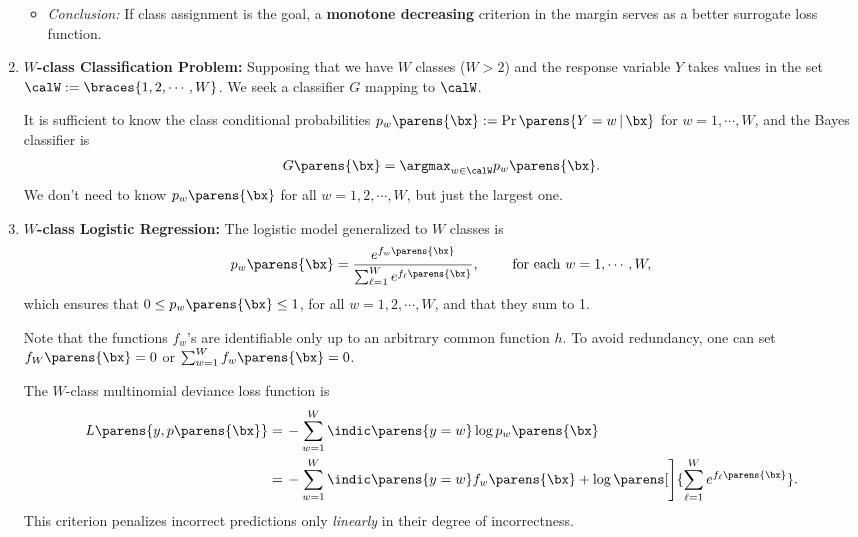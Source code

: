 \documentclass[12pt]{article}
\begin{document}
\begin{enumerate}[label=\textbf{\arabic*.}]
\begin{itemize}
		\item \textit{Conclusion:} If class assignment is the goal, a \textbf{monotone decreasing} criterion in the margin serves as a better surrogate loss function. 
		
	\end{itemize}
	
	\item \textbf{$W$-class Classification Problem:} Supposing that we have $W$ classes ($W > 2$) and the response variable $Y$ takes values in the set $\calW := \braces{1, 2, \cdots, W}$. We seek a classifier $G$ mapping to $\calW$. 
	
	It is sufficient to know the class conditional probabilities $p_w \parens{\bx} := \Pr \parens{Y = w \,\vert\, \bx}$ for $w = 1, \cdots, W$, and the Bayes classifier is 
	\begin{align*}
		G \parens{\bx} = \argmax_{w \in \calW} p_{w} \parens{\bx}. 
	\end{align*}
	We don't need to know $p_w \parens{\bx}$ for all $w = 1, 2, \cdots, W$, but just the largest one. 
	
	\item \textbf{$W$-class Logistic Regression:} The logistic model generalized to $W$ classes is 
	\begin{align*}
		p_w \parens{\bx} = \frac{e^{f_w \parens{\bx}}}{\sum_{\ell = 1}^W e^{f_{\ell} \parens{\bx}}}, \qquad \text{ for each } w = 1, \cdots, W, 
	\end{align*}
	which ensures that $0 \le p_w \parens{\bx} \le 1$, for all $w = 1, 2, \cdots, W$, and that they sum to 1. 
	
	Note that the functions $f_w$'s are identifiable only up to an arbitrary common function $h$. To avoid redundancy, one can set $f_W \parens{\bx} = 0$ or $\sum_{w=1}^W f_w \parens{\bx} = 0$. 
	
	The $W$-class multinomial deviance loss function is 
	\begin{align*}
		L \parens{y, p \parens{\bx}} = & \, - \sum_{w=1}^W \indic \parens{y = w} \log p_w \parens{\bx} \nonumber \\ 
		= & \, - \sum_{w=1}^W \indic \parens{y = w} f_w \parens{\bx} + \log \parens[\Bigg]{\sum_{\ell = 1}^W e^{f_{\ell} \parens{\bx}}}. 
	\end{align*}
	This criterion penalizes incorrect predictions only \textit{linearly} in their degree of incorrectness. 
	
\end{enumerate}
\end{document}
